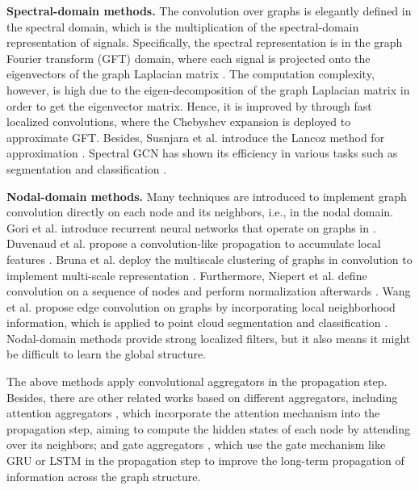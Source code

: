 \documentclass[conference]{IEEEtran}
\begin{document}
\textbf{Spectral-domain methods.} The convolution over graphs is elegantly defined in the spectral domain, which is the multiplication of the spectral-domain representation of signals. Specifically, the spectral representation is in the graph Fourier transform (GFT) \cite{hammond2011wavelets} domain, where each signal is projected onto the eigenvectors of the graph Laplacian matrix \cite{hammond2011wavelets, henaff2015deep}. The computation complexity, however, is high due to the eigen-decomposition of the graph Laplacian matrix in order to get the eigenvector matrix. Hence, it is improved by \cite{defferrard2016convolutional} through fast localized convolutions, where the Chebyshev expansion is deployed to approximate GFT. Besides, Susnjara et al. introduce the Lancoz method for approximation \cite{susnjara2015accelerated}. Spectral GCN has shown its efficiency in various tasks such as segmentation and classification \cite{kipf2016semi, Te18mm}.
    
\textbf{Nodal-domain methods.} Many techniques are introduced to implement graph convolution directly on each node and its neighbors, i.e., in the nodal domain. Gori et al. introduce recurrent neural networks that operate on graphs in \cite{gori2005new}. Duvenaud et al. propose a convolution-like propagation to accumulate local features \cite{duvenaud2015convolutional}. Bruna et al. deploy the multiscale clustering of graphs in convolution to implement multi-scale representation \cite{bruna2013spectral}. Furthermore, Niepert et al. define convolution on a sequence of nodes and perform normalization afterwards \cite{niepert2016learning}. Wang et al. propose edge convolution on graphs by incorporating local neighborhood information, which is applied to point cloud segmentation and classification \cite{wang2018dynamic}. Nodal-domain methods provide strong localized filters, but it also means it might be difficult to learn the global structure.

The above methods apply convolutional aggregators in the propagation step. Besides, there are other related works based on different aggregators, including attention aggregators \cite{velivckovic2018graph}, which incorporate the attention mechanism \cite{vaswani2017attention} into the propagation step, aiming to compute the hidden states of each node by attending over its neighbors; and gate aggregators \cite{li2016gated, tai2015improved, zayats2018conversation, peng2017cross, zhang2018sentence, liang2016semantic}, which use the gate mechanism like GRU \cite{cho2014association} or LSTM \cite{hochreiter1997long} in the propagation step to improve the long-term propagation of information across the graph structure.
\end{document}
